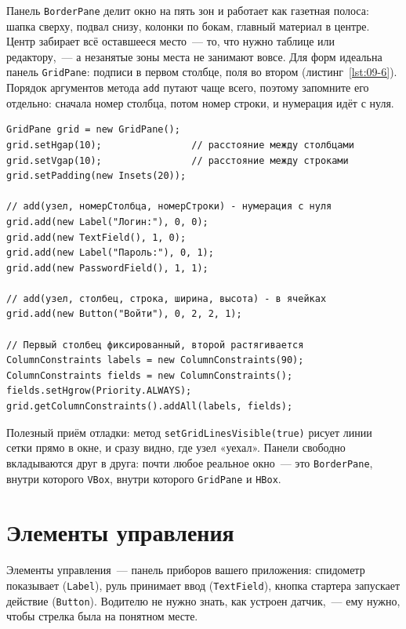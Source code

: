 Панель \texttt{BorderPane} делит окно на пять зон и работает как газетная
полоса: шапка сверху, подвал снизу, колонки по бокам, главный материал в центре.
Центр забирает всё оставшееся место~--- то, что нужно таблице или редактору,~---
а незанятые зоны места не занимают вовсе. Для форм идеальна панель
\texttt{GridPane}: подписи в первом столбце, поля во втором
(листинг~\ref{lst:09-6}). Порядок аргументов метода \texttt{add} путают чаще
всего, поэтому запомните его отдельно: сначала номер столбца, потом номер
строки, и нумерация идёт с нуля.

\begin{listing}[H]
\begin{verbatim}
GridPane grid = new GridPane();
grid.setHgap(10);                // расстояние между столбцами
grid.setVgap(10);                // расстояние между строками
grid.setPadding(new Insets(20));

// add(узел, номерСтолбца, номерСтроки) - нумерация с нуля
grid.add(new Label("Логин:"), 0, 0);
grid.add(new TextField(), 1, 0);
grid.add(new Label("Пароль:"), 0, 1);
grid.add(new PasswordField(), 1, 1);

// add(узел, столбец, строка, ширина, высота) - в ячейках
grid.add(new Button("Войти"), 0, 2, 2, 1);

// Первый столбец фиксированный, второй растягивается
ColumnConstraints labels = new ColumnConstraints(90);
ColumnConstraints fields = new ColumnConstraints();
fields.setHgrow(Priority.ALWAYS);
grid.getColumnConstraints().addAll(labels, fields);
\end{verbatim}
\caption{Форма на панели GridPane}
\label{lst:09-6}
\end{listing}

Полезный приём отладки: метод \texttt{setGridLinesVisible(true)} рисует линии
сетки прямо в окне, и сразу видно, где узел «уехал». Панели свободно вкладываются друг в друга: почти любое
реальное окно~--- это \texttt{BorderPane}, внутри которого \texttt{VBox}, внутри
которого \texttt{GridPane} и \texttt{HBox}.

\section{Элементы управления}

Элементы управления~--- панель приборов вашего приложения: спидометр показывает
(\texttt{Label}), руль принимает ввод (\texttt{TextField}), кнопка стартера
запускает действие (\texttt{Button}). Водителю не нужно знать, как устроен
датчик,~--- ему нужно, чтобы стрелка была на понятном месте.

